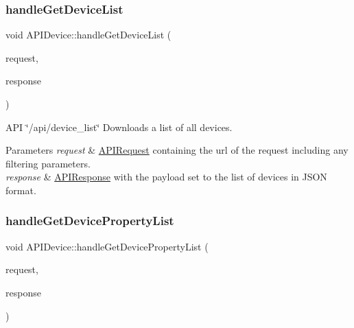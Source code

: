 \subsubsection{\texorpdfstring{handle\+Get\+Device\+List}{handleGetDeviceList}}
{\footnotesize\ttfamily void A\+P\+I\+Device\+::handle\+Get\+Device\+List (\begin{DoxyParamCaption}\item[{const \hyperlink{class_a_p_i_request}{A\+P\+I\+Request} \&}]{request,  }\item[{\hyperlink{class_a_p_i_response}{A\+P\+I\+Response} $\ast$}]{response }\end{DoxyParamCaption})\hspace{0.3cm}{\ttfamily [slot]}}

A\+PI \char`\"{}/api/device\+\_\+list\char`\"{} Downloads a list of all devices. 
\begin{DoxyParams}{Parameters}
{\em request} & \hyperlink{class_a_p_i_request}{A\+P\+I\+Request} containing the url of the request including any filtering parameters. \\
\hline
{\em response} & \hyperlink{class_a_p_i_response}{A\+P\+I\+Response} with the payload set to the list of devices in J\+S\+ON format. \\
\hline
\end{DoxyParams}
\mbox{\label{class_a_p_i_device_a5be87488af611d8ef61501a07e4a39d9}} 
\subsubsection{\texorpdfstring{handle\+Get\+Device\+Property\+List}{handleGetDevicePropertyList}}
{\footnotesize\ttfamily void A\+P\+I\+Device\+::handle\+Get\+Device\+Property\+List (\begin{DoxyParamCaption}\item[{const \hyperlink{class_a_p_i_request}{A\+P\+I\+Request} \&}]{request,  }\item[{\hyperlink{class_a_p_i_response}{A\+P\+I\+Response} $\ast$}]{response }\end{DoxyParamCaption})\hspace{0.3cm}{\ttfamily [slot]}}

